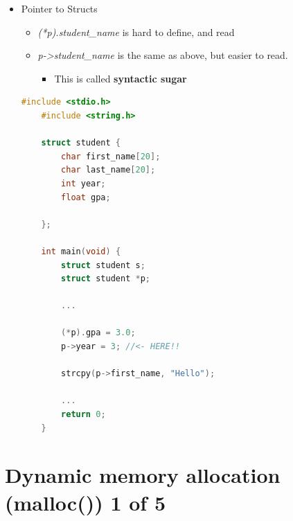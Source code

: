 \documentclass[12pt]{article}
\begin{document}
\begin{itemize}
    \item Pointer to Structs
    \begin{itemize}
        \item \textit{(*p).student\_name} is hard to define, and read
        \item \textit{p-\textgreater student\_name} is the same as above, but easier to read.
        \begin{itemize}
            \item This is called \textbf{syntactic sugar}
        \end{itemize}
    \end{itemize}

    \begin{lstlisting}[language=c,caption={struct\_example\_3.c}]
    #include <stdio.h>
    #include <string.h>

    struct student {
        char first_name[20];
        char last_name[20];
        int year;
        float gpa;

    };

    int main(void) {
        struct student s;
        struct student *p;

        ...

        (*p).gpa = 3.0;
        p->year = 3; //<- HERE!!

        strcpy(p->first_name, "Hello");

        ...
        return 0;
    }
    \end{lstlisting}
\end{itemize}

\bigskip

\section*{Dynamic memory allocation (malloc()) 1 of 5}

\bigskip
\end{document}
